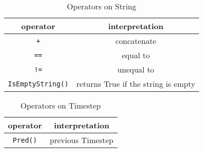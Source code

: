 \documentclass[12pt]{article}
\renewcommand{\optional}[1]{} %
\begin{document}
\begin{table}[h]
\centering
\caption{Operators on String}
\begin{tabular}{ c c }
\toprule 
operator & interpretation \\
\midrule
{\tt +} & concatenate \\ 
{\tt ==} & equal to \\
{\tt !=} & unequal to \\ 
\verb|IsEmptyString()| & returns True if the string is empty\\
\bottomrule
\end{tabular}
\end{table}

\begin{table}[h]
\centering
\caption{Operators on Timestep}
\begin{tabular}{ c c }
\toprule 
operator & interpretation \\
\midrule
\verb|Pred()| & previous Timestep\\
\bottomrule
\end{tabular}
\end{table}

\optional{

\section{Built-in distributions}
\begin{itemize}
\item Bernoulli
\item Beta
\item Binomial
\item Categorical
\item Dirichlet
\item Exponential
\item Gamma
\item Gaussian
\item Geometric
\item MultivarGaussian
\item NegativeBinomial
\item Poisson
\item TabularCPD
\item UniformChoice
\item UniformInt
\item UniformReal
\end{itemize}

}
\end{document}
